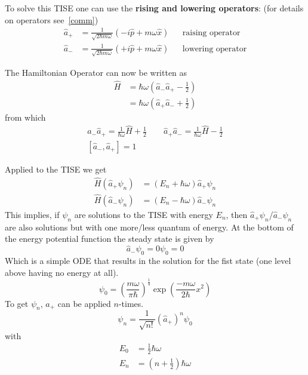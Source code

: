 
To solve this TISE one can use the \textbf{rising and lowering operators}: (for details on operators see~\ref{comm})
\begin{align*}
    \widehat{a}_{+} & = \frac{1}{\sqrt{2\hbar m \omega}}\left(-i\widehat{p}+m\omega\widehat{x}\right) &  & \text{raising operator}  \\
    \widehat{a}_{-} & = \frac{1}{\sqrt{2\hbar m \omega}}\left(+i\widehat{p}+m\omega\widehat{x}\right) &  & \text{lowering operator}
\end{align*}


The Hamiltonian Operator can now be written as
\noindent\begin{align*}
    \widehat{H} & =\hbar\omega\left(\widehat{a}_{-}\widehat{a}_{+}-\frac{1}{2}\right) \\
                & =\hbar\omega\left(\widehat{a}_{+}\widehat{a}_{-}+\frac{1}{2}\right)
\end{align*}
from which
\noindent\begin{gather*}
    \widehat{a}_{-}\widehat{a}_{+}=\frac{1}{\hbar\omega}\widehat{H}+\frac{1}{2} \quad\quad \widehat{a}_{+}\widehat{a}_{-}=\frac{1}{\hbar\omega}\widehat{H}-\frac{1}{2}\\
    \left[\widehat{a}_{-},\widehat{a}_{+}\right] = 1
\end{gather*}


Applied to the TISE we get
\begin{align*}
    \widehat{H}(\widehat{a}_{+}\psi_n) & = (E_n+\hbar\omega)\widehat{a}_{+}\psi_n \\
    \widehat{H}(\widehat{a}_{-}\psi_n) & = (E_n-\hbar\omega)\widehat{a}_{-}\psi_n
\end{align*}
This implies, if $\psi_n$ are solutions to the TISE with energy $E_n$, then $\widehat{a}_{+}\psi_n$/$\widehat{a}_{-}\psi_n$ are also solutions but with one more/less quantum of energy.
\newpar{}
At the bottom of the energy potential function the steady state is given by
\begin{equation*}
    \widehat{a}_{-}\psi_0 = 0\psi_0 = 0
\end{equation*}
Which is a simple ODE that results in the solution for the fist state (one level above having no energy at all).
\begin{equation*}
    \psi_0 = {\left(\frac{m\omega}{\pi\hbar}\right)}^{\frac{1}{4}}\exp\left(\frac{-m\omega}{2\hbar}x^2\right)
\end{equation*}
To get $\psi_n$, $\widehat{a}_{+}$ can be applied $n$-times.
\begin{equation*}
    \psi_n = \frac{1}{\sqrt{n!}}{\left(\widehat{a}_{+}\right)}^n \psi_0
\end{equation*}
with
\begin{align*}
    E_0 & = \frac{1}{2}\hbar\omega     \\
    E_n & = (n+\frac{1}{2})\hbar\omega
\end{align*}

